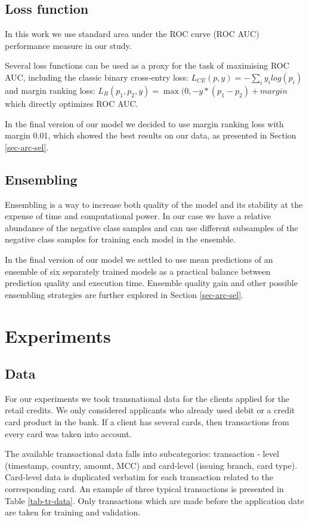 \documentclass[sigconf]{acmart}
\begin{document}
\subsection{Loss function}

In this work we use standard area under the ROC curve (ROC AUC) performance measure in our study.

Several loss functions can be used as a proxy for the task of maximising ROC AUC, including the classic binary cross-entry loss: $L_{CE}(p, y) = - \sum_i y_ilog(p_i)$ and margin ranking loss: $ L_R(p_1, p_2, y) = \max(0, -y * (p_1 - p_2) + margin $ which directly optimizes ROC AUC.

In the final version of our model we decided to use margin ranking loss with margin 0.01, which showed the best results on our data, as presented in Section \ref{sec-arc-sel}.

\subsection{Ensembling}

Ensembling \cite{breiman1996bagging} is a way to increase both quality of the model and its stability at the expense of time and computational power. In our case we have a relative abundance of the negative class samples and can use different subsamples of the negative class samples for training each model in the ensemble.

In the final version of our model we settled to use mean predictions of an ensemble of six separately trained models as a practical balance between prediction quality and execution time. Ensemble quality gain and other possible ensembling strategies are further explored in Section \ref{sec-arc-sel}.

\section{Experiments} \label{sec-exp}
\subsection{Data} \label{sec-data}

For our experiments we took transnational data for the clients applied for the retail credits. We only considered applicants who already used debit or a credit card product in the bank. If a client has several cards, then transactions from every card was taken into account.

The available transactional data falls into subcategories: transaction - level (timestamp, country, amount, MCC) and card-level (issuing branch, card type). Card-level data is duplicated verbatim for each transaction related to the corresponding card. An example of three typical transactions is presented in Table \ref{tab-tr-data}. Only transactions which are made before the application date are taken for training and validation.
\end{document}

